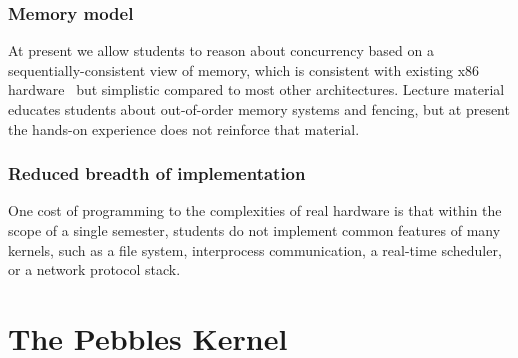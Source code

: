\subsubsection{Memory model}

At present we allow students
to reason about concurrency based on a
sequentially-consistent view of
memory, which is consistent with
existing x86 hardware~\cite{SewellSOZNM:x86tso-cacm10}
but simplistic compared to most other
architectures.
Lecture material educates students about
out-of-order memory systems
and fencing,
but at present the hands-on experience does not
reinforce that material.

\subsubsection{Reduced breadth of implementation}

One cost of programming to the complexities of
real hardware is that
within the scope of a single semester,
students do not 
implement common features of many kernels,
such as a file system, interprocess communication,
a real-time scheduler,
or a network protocol stack.

\section{The Pebbles Kernel}
\label{sec:pebbles}

